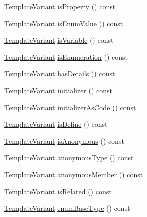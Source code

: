 \begin{DoxyCompactItemize}
\item 
\hyperlink{class_template_variant}{Template\+Variant} \hyperlink{class_member_context_1_1_private_a5c323a9649b0bcbd71f4765c78531c33}{is\+Property} () const 
\item 
\hyperlink{class_template_variant}{Template\+Variant} \hyperlink{class_member_context_1_1_private_ac33629e6c8936786937b096a7a4e66f7}{is\+Enum\+Value} () const 
\item 
\hyperlink{class_template_variant}{Template\+Variant} \hyperlink{class_member_context_1_1_private_ac1d6c0c54997d83ba07686c15645a709}{is\+Variable} () const 
\item 
\hyperlink{class_template_variant}{Template\+Variant} \hyperlink{class_member_context_1_1_private_a29b0a2edd1e73c7340147c2d62adf3b7}{is\+Enumeration} () const 
\item 
\hyperlink{class_template_variant}{Template\+Variant} \hyperlink{class_member_context_1_1_private_a3933ff72e2ee53bcc4e65fac18b8b792}{has\+Details} () const 
\item 
\hyperlink{class_template_variant}{Template\+Variant} \hyperlink{class_member_context_1_1_private_a4e58b8e195e7e5f31d34cfdaf448f955}{initializer} () const 
\item 
\hyperlink{class_template_variant}{Template\+Variant} \hyperlink{class_member_context_1_1_private_a96d1f7ae9b64ccf6fc1372785c921955}{initializer\+As\+Code} () const 
\item 
\hyperlink{class_template_variant}{Template\+Variant} \hyperlink{class_member_context_1_1_private_ac2af1976a50d2bf8448637cee83e86df}{is\+Define} () const 
\item 
\hyperlink{class_template_variant}{Template\+Variant} \hyperlink{class_member_context_1_1_private_a9907db0bd04dda7737dabded30602e2e}{is\+Anonymous} () const 
\item 
\hyperlink{class_template_variant}{Template\+Variant} \hyperlink{class_member_context_1_1_private_a8dd8bbb350a8d3ea7ce99c25402bb471}{anonymous\+Type} () const 
\item 
\hyperlink{class_template_variant}{Template\+Variant} \hyperlink{class_member_context_1_1_private_afd615dd79c0a026eb98a93ff68f60b4f}{anonymous\+Member} () const 
\item 
\hyperlink{class_template_variant}{Template\+Variant} \hyperlink{class_member_context_1_1_private_a47791033b86c3d647afe53259a20f761}{is\+Related} () const 
\item 
\hyperlink{class_template_variant}{Template\+Variant} \hyperlink{class_member_context_1_1_private_a0e7edfffaf091cd5fc09fce9645e9745}{enum\+Base\+Type} () const 

\end{DoxyCompactItemize}
